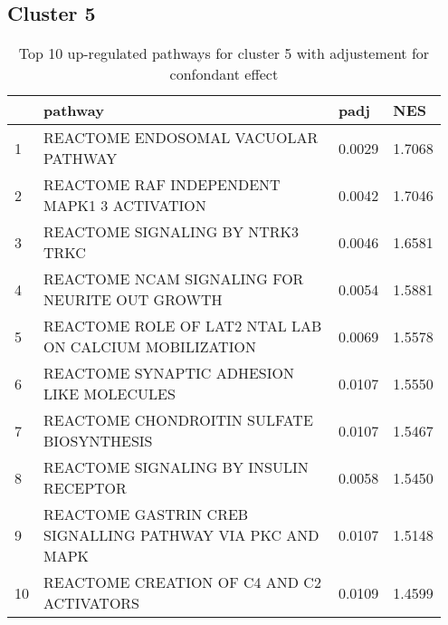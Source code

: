 \documentclass{article}
\begin{document}
\subsection{Cluster 5 }
\begin{table}[H]
\centering
\begin{tabular}{p{0.05\linewidth}p{0.7\linewidth}p{0.1\linewidth}p{0.1\linewidth}}
  \hline
 & pathway & padj & NES \\ 
  \hline
1 & REACTOME ENDOSOMAL VACUOLAR PATHWAY & 0.0029 & 1.7068 \\ 
  2 & REACTOME RAF INDEPENDENT MAPK1 3 ACTIVATION & 0.0042 & 1.7046 \\ 
  3 & REACTOME SIGNALING BY NTRK3 TRKC & 0.0046 & 1.6581 \\ 
  4 & REACTOME NCAM SIGNALING FOR NEURITE OUT GROWTH & 0.0054 & 1.5881 \\ 
  5 & REACTOME ROLE OF LAT2 NTAL LAB ON CALCIUM MOBILIZATION & 0.0069 & 1.5578 \\ 
  6 & REACTOME SYNAPTIC ADHESION LIKE MOLECULES & 0.0107 & 1.5550 \\ 
  7 & REACTOME CHONDROITIN SULFATE BIOSYNTHESIS & 0.0107 & 1.5467 \\ 
  8 & REACTOME SIGNALING BY INSULIN RECEPTOR & 0.0058 & 1.5450 \\ 
  9 & REACTOME GASTRIN CREB SIGNALLING PATHWAY VIA PKC AND MAPK & 0.0107 & 1.5148 \\ 
  10 & REACTOME CREATION OF C4 AND C2 ACTIVATORS & 0.0109 & 1.4599 \\ 
   \hline
\end{tabular}
\caption{Top 10 up-regulated pathways for cluster 5 with adjustement for confondant effect} 
\label{tab:q3_2_conf_5}
\end{table}
\end{document}
